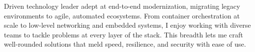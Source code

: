 \begin{cvparagraph}

Driven technology leader adept at end-to-end modernization, migrating legacy environments to agile, automated
ecosystems. From container orchestration at scale to low-level networking and embedded systems, I enjoy working with
diverse teams to tackle problems at every layer of the stack. This breadth lets me craft well-rounded solutions that
meld speed, resilience, and security with ease of use.

\end{cvparagraph}
